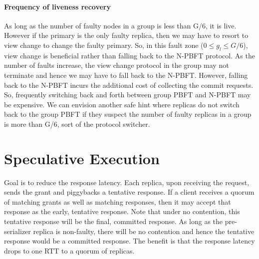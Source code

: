 \documentclass[twocolumn,10pt]{article}
\begin{document}
\paragraph{Frequency of liveness recovery} As long as the number of faulty nodes in a group is less than G/6, it is live. 
However if the primary is the only faulty replica, then we may have to resort to view change to change the faulty primary.
So, in this fault zone ($0 \le g_l \le G/6$), view change
is beneficial rather than falling back to the N-PBFT protocol. As the number of faults increase, the view change protocol in the group
may not terminate and hence we may have to fall back to the N-PBFT. However, falling back to the N-PBFT incurs the additional cost of 
collecting the commit requests. So, frequently switching back and forth between group PBFT and N-PBFT may be expensive. We can
envision another safe hint where replicas do not switch back to the group PBFT if they suspect the number of faulty replicas in a group is
more than G/6, sort of the protocol switcher.





























\section{Speculative Execution}

Goal is to reduce the response latency. Each replica,
upon receiving the request, sends the grant and piggybacks a tentative response. If a
client receives a quorum of matching grants as well as matching responses, then it
may accept that response as the early, tentative response. Note that under no
contention, this tentative response will be the final, committed response. As long as the
pre-serializer replica is non-faulty, there will be no contention and hence the 
tentative response would be a committed response. The benefit is that the response latency
drops to one RTT to a quorum of replicas.
\end{document}
